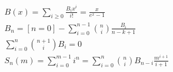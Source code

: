 \noindent

\begin{math}
    \begin{aligned}
    B(x)=\sum_{i\ge 0}\frac{B_i x^i}{i!}=\frac x{e^x-1} \\
    B_n=[n=0]-\sum_{i=0}^{n-1}{n\choose i}\frac{B_i}{n-k+1} \\
    \sum_{i=0}^n{n+1\choose i}B_i=0 \\
    S_n(m)=\sum_{i=0}^{m-1}i^n=\sum_{i=0}^n{n\choose i}B_{n-i}\frac{m^{i+1}}{i+1}
    \end{aligned}
\end{math}